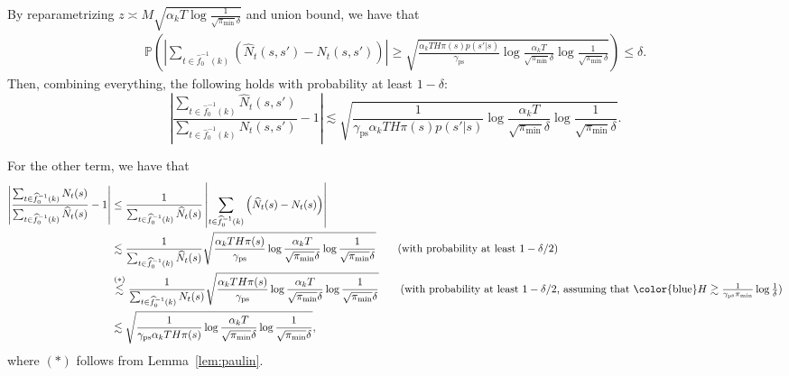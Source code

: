 \documentclass[twoside]{article}
\def\sP{{\mathbb{P}}}
\theoremstyle{plain}
\newcommand{\ps}{\mathrm{ps}}
\begin{document}
By reparametrizing $z \asymp M \sqrt{\alpha_k T \log\frac{1}{\sqrt{\pi_{\min}} \delta}}$ and union bound, we have that
\begin{align*}
    \sP\left( \left| \sum_{t \in \widehat{f}_0^{-1}(k)} \left( \widehat{N}_t(s, s') - N_t(s, s') \right)\right| \geq \sqrt{\frac{\alpha_k T H \pi(s) p(s' | s)}{\gamma_\ps} \log\frac{\alpha_k T}{\sqrt{\pi_{\min}} \delta} \log\frac{1}{\sqrt{\pi_{\min}} \delta}} \right) \leq \delta.
\end{align*}
Then, combining everything, the following holds with probability at least $1 - \delta$:
\begin{equation}
    \left| \frac{\sum_{t \in \widehat{f}_0^{-1}(k)} \widehat{N}_t(s, s')}{\sum_{t \in \widehat{f}_0^{-1}(k)} N_t(s, s')} - 1 \right| \lesssim \sqrt{\frac{1}{\gamma_\ps \alpha_k T H \pi(s) p(s' | s)} \log\frac{\alpha_k T}{\sqrt{\pi_{\min}} \delta} \log\frac{1}{\sqrt{\pi_{\min}} \delta}}.
\end{equation}

For the other term, we have that
\begin{align*}
    \left| \frac{\sum_{t \in \widehat{f}_0^{-1}(k)} N_t(s)}{\sum_{t \in \widehat{f}_0^{-1}(k)} \widehat{N}_t(s)} - 1 \right| &\leq \frac{1}{\sum_{t \in \widehat{f}_0^{-1}(k)} \widehat{N}_t(s)} \left| \sum_{t \in \widehat{f}_0^{-1}(k)} \left( \widehat{N}_t(s) - N_t(s) \right)\right| \\
    &\lesssim \frac{1}{\sum_{t \in \widehat{f}_0^{-1}(k)} \widehat{N}_t(s)} \sqrt{\frac{\alpha_k T H \pi(s)}{\gamma_\ps} \log\frac{\alpha_k T}{\sqrt{\pi_{\min}} \delta} \log\frac{1}{\sqrt{\pi_{\min}} \delta}} \tag{with probability at least $1 - \delta / 2$} \\
    &\overset{(*)}{\lesssim} \frac{1}{\sum_{t \in \widehat{f}_0^{-1}(k)} N_t(s)} \sqrt{\frac{\alpha_k T H \pi(s)}{\gamma_\ps} \log\frac{\alpha_k T}{\sqrt{\pi_{\min}} \delta} \log\frac{1}{\sqrt{\pi_{\min}} \delta}} \tag{with probability at least $1 - \delta/ 2$, assuming that {\color{blue}$H \gtrsim \frac{1}{\gamma_\ps \pi_{\min}} \log\frac{1}{\delta}$}} \\
    &\lesssim \sqrt{\frac{1}{\gamma_\ps \alpha_k T H \pi(s)} \log\frac{\alpha_k T}{\sqrt{\pi_{\min}} \delta} \log\frac{1}{\sqrt{\pi_{\min}} \delta}},
\end{align*}
where $(*)$ follows from Lemma~\ref{lem:paulin}.
\end{document}
